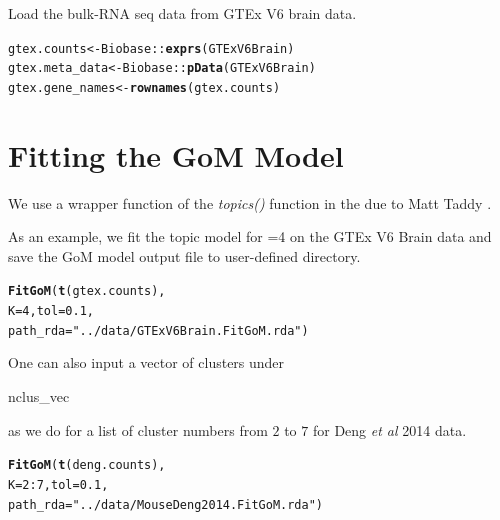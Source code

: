 \documentclass[12pt]{article}\usepackage[]{graphicx}\usepackage[usenames,dvipsnames]{color}
\makeatletter
\newcommand{\hlnum}[1]{\textcolor[rgb]{0.686,0.059,0.569}{#1}}%
\newcommand{\hlstr}[1]{\textcolor[rgb]{0.192,0.494,0.8}{#1}}%
\newcommand{\hlopt}[1]{\textcolor[rgb]{0,0,0}{#1}}%
\newcommand{\hlstd}[1]{\textcolor[rgb]{0.345,0.345,0.345}{#1}}%
\newcommand{\hlkwb}[1]{\textcolor[rgb]{0.69,0.353,0.396}{#1}}%
\newcommand{\hlkwc}[1]{\textcolor[rgb]{0.333,0.667,0.333}{#1}}%
\newcommand{\hlkwd}[1]{\textcolor[rgb]{0.737,0.353,0.396}{\textbf{#1}}}%
\newenvironment{kframe}{%
 \def\at@end@of@kframe{}%
 \ifinner\ifhmode%
  \def\at@end@of@kframe{\end{minipage}}%
  \begin{minipage}{\columnwidth}%
 \fi\fi%
 \def\FrameCommand##1{\hskip\@totalleftmargin \hskip-\fboxsep
 \colorbox{shadecolor}{##1}\hskip-\fboxsep
     \hskip-\linewidth \hskip-\@totalleftmargin \hskip\columnwidth}%
 \MakeFramed {\advance\hsize-\width
   \@totalleftmargin\z@ \linewidth\hsize
   \@setminipage}}%
 {\par\unskip\endMakeFramed%
 \at@end@of@kframe}
\newenvironment{knitrout}{}{} %
\makeatother
\begin{document}
Load the bulk-RNA seq data from GTEx V6 brain data.

\begin{knitrout}
\color{fgcolor}\begin{kframe}
\begin{alltt}
\hlstd{gtex.counts} \hlkwb{<-} \hlstd{Biobase}\hlopt{::}\hlkwd{exprs}\hlstd{(GTExV6Brain)}
\hlstd{gtex.meta_data} \hlkwb{<-} \hlstd{Biobase}\hlopt{::}\hlkwd{pData}\hlstd{(GTExV6Brain)}
\hlstd{gtex.gene_names} \hlkwb{<-} \hlkwd{rownames}\hlstd{(gtex.counts)}
\end{alltt}
\end{kframe}
\end{knitrout}


\section{Fitting the GoM Model}

We use a wrapper function of the \textit{topics()} function in the  due to Matt Taddy \cite{Taddy2012}.

As an example, we fit the topic model for =4 on the GTEx V6 Brain data and save the GoM model output file to user-defined directory.

\begin{knitrout}
\color{fgcolor}\begin{kframe}
\begin{alltt}
\hlkwd{FitGoM}\hlstd{(}\hlkwd{t}\hlstd{(gtex.counts),}
            \hlkwc{K}\hlstd{=}\hlnum{4}\hlstd{,} \hlkwc{tol}\hlstd{=}\hlnum{0.1}\hlstd{,}
            \hlkwc{path_rda}\hlstd{=}\hlstr{"../data/GTExV6Brain.FitGoM.rda"}\hlstd{)}
\end{alltt}
\end{kframe}
\end{knitrout}

One can also input a vector of clusters under \begin{verb} nclus_vec \end{verb} as we do for a list of cluster numbers from $2$ to $7$ for Deng \textit{et al} 2014 data.

\begin{knitrout}
\color{fgcolor}\begin{kframe}
\begin{alltt}
\hlkwd{FitGoM}\hlstd{(}\hlkwd{t}\hlstd{(deng.counts),}
            \hlkwc{K}\hlstd{=}\hlnum{2}\hlopt{:}\hlnum{7}\hlstd{,} \hlkwc{tol}\hlstd{=}\hlnum{0.1}\hlstd{,}
            \hlkwc{path_rda}\hlstd{=}\hlstr{"../data/MouseDeng2014.FitGoM.rda"}\hlstd{)}
\end{alltt}
\end{kframe}
\end{knitrout}
\end{document}
